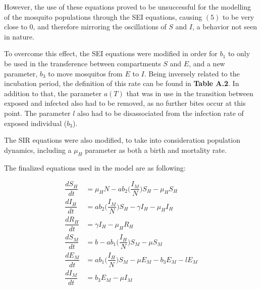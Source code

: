 \documentclass[a4paper,fleqn]{cas-dc}
\begin{document}
However, the use of these equations proved to be unsuccessful for the modelling of the mosquito populations through the SEI equations, 
causing $(5)$ to be very close to 0, and therefore mirroring the oscillations of $S$ and $I$, a behavior not seen in nature. 

To overcome this effect, the SEI equations were modified in order for $b_1$ to only be used in the transference between compartments $S$ and $E$, 
and a new parameter, $b_3$ to move mosquitos from $E$ to $I$. Being inversely related to the incubation period, the definition of this rate can be found in \textbf{Table A.2}. 
In addition to that, the parameter $a(T)$ that was in use in the transition between exposed and infected also had to be removed, as no further bites occur at this point. 
The parameter $l$ also had to be disassociated from the infection rate of exposed individual ($b_3$).

The SIR equations were also modified, to take into consideration population dynamics, including a $\mu_H$ parameter as both a birth and mortality rate.

The finalized equations used in the model are as following:  

\begin{align}
\dfrac{dS_H}{dt} & = \mu_HN-ab_2\bigg(\dfrac{I_M}{N}\bigg)S_H - \mu_HS_H \label{eq1}\\ %
\dfrac{dI_H}{dt} & = ab_2\bigg(\dfrac{I_M}{N}\bigg)S_H-\gamma I_H - \mu_HI_H \label{eq2}\\ %
\dfrac{dR_H}{dt} & = \gamma I_H - \mu_HR_H \label{eq3}\\ %
\dfrac{dS_M}{dt} & = b - ab_1\bigg(\dfrac{I_H}{N}\bigg)S_M - \mu S_M \label{eq4}\\ %
\dfrac{dE_M}{dt} & = ab_1\bigg(\dfrac{I_H}{N}\bigg)S_M - \mu E_M - b_3E_M -lE_M \label{eq5} \\%
\dfrac{dI_M}{dt} & = b_3E_M -\mu I_M  \label{eq6} %
\end{align}
\end{document}
